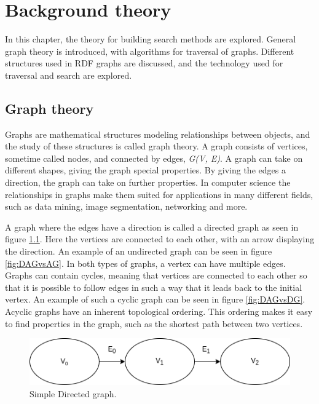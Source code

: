 \chapter{Background theory}
\label{cha:background_theory}
In this chapter, the theory for building search methods are explored. General graph theory is introduced, with algorithms for traversal of graphs. Different structures used in RDF graphs are discussed, and the technology used for traversal and search are explored.

\section{Graph theory}
Graphs are mathematical structures modeling relationships between objects, and the study of these structures is called graph theory. A graph consists of vertices, sometime called nodes, and connected by edges, \emph{G(V, E)}. A graph can take on different shapes, giving the graph special properties. By giving the edges a direction, the graph can take on further properties. In computer science the relationships in graphs make them suited for applications in many different fields, such as data mining, image segmentation, networking and more\cite{riaz2011applications}. 

A graph where the edges have a direction is called a directed graph as seen in figure \ref{fig:DAG}. Here the vertices are connected to each other, with an arrow displaying the direction. An example of an undirected graph can be seen in figure \ref{fig:DAGvsAG}. In both types of graphs, a vertex can have multiple edges. Graphs can contain cycles, meaning that vertices are connected to each other so that it is possible to follow edges in such a way that it leads back to the initial vertex. An example of such a cyclic graph can be seen in figure \ref{fig:DAGvsDG}. Acyclic graphs have an inherent topological ordering. This ordering makes it easy to find properties in the graph, such as the shortest path between two vertices.

\begin{figure}
    \centering
    \includegraphics[scale=0.5]{figs/simpleDAG.png}
    \caption{Simple Directed graph.}
    \label{fig:DAG}
\end{figure}

